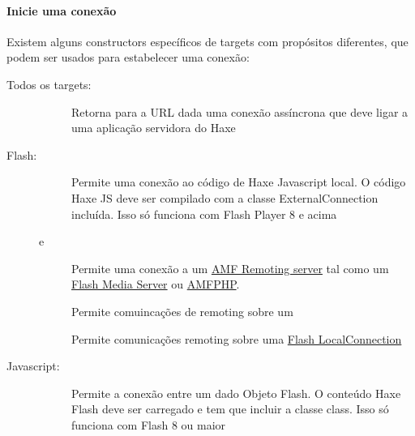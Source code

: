 {\paragraph{Inicie uma conexão}
Existem alguns constructors específicos de targets com propósitos diferentes, que podem ser usados para estabelecer uma conexão:

\begin{description}
	\item[Todos os targets:]
		\begin{description}
			\item[]  
				Retorna para a URL dada uma conexão assíncrona que deve ligar a uma aplicação servidora do Haxe 
		\end{description}
		
	\item[Flash:]
		\begin{description}
			\item[]  
			    Permite uma conexão ao código de Haxe Javascript local. O código Haxe JS deve ser compilado com a classe ExternalConnection incluída. Isso só funciona com Flash Player 8 e acima
			\item[ e ]  
                Permite uma conexão a um \href{http://en.wikipedia.org/wiki/Action_Message_Format}{AMF Remoting server} tal como um  \href{http://www.adobe.com/products/adobe-media-server-family.html}{Flash Media Server} ou \href{http://www.silexlabs.org/amfphp/}{AMFPHP}.
			\item[]  
                Permite comuincações de remoting sobre um 
			\item[]  
				Permite comunicações remoting sobre uma \href{http://api.haxe.org/haxe/remoting/LocalConnection.html}{Flash LocalConnection}
		\end{description}
	\item[Javascript:]
		\begin{description}
			\item[]  
				Permite a conexão entre um dado Objeto Flash. O conteúdo Haxe Flash deve ser carregado e tem que incluir a classe  class. Isso só funciona com Flash 8 ou maior 
		\end{description}
		

\end{description}}
